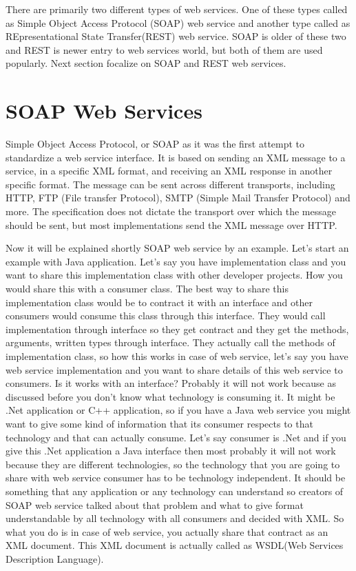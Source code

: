 There are primarily two different types of web services. One of these types called as  Simple Object Access Protocol (SOAP) web service and another type called as REpresentational State Transfer(REST) web service. SOAP is older of these two and REST is newer entry to web services world, but both of them are used popularly. Next section focalize on SOAP and REST web services.

\section{SOAP Web Services}
\label{section:soa}

Simple Object Access Protocol, or SOAP as it was the first attempt to standardize a web service interface. It is based on sending an XML message to a service, in a specific XML format, and receiving an XML response in another specific format. The message can be sent across different transports, including HTTP, FTP (File transfer Protocol), SMTP (Simple Mail Transfer Protocol) and more\citep{thesis:state2}. The specification does not dictate the transport over which the message should be sent, but most implementations send the XML message over HTTP.

Now it will be explained shortly SOAP web service by an example. Let’s start an example with Java application. Let’s say you have implementation class and you want to share this implementation class with other developer projects. How you would share this with a consumer class. The best way to share this implementation class would be to contract it with an interface and other consumers would consume this class through this interface. They would call implementation through interface so they get contract and they get the methods, arguments, written types through interface. They actually call the methods of implementation class, so how this works in case of web service, let’s say you have web service implementation and you want to share details of this web service to consumers. Is it works with an interface? Probably it will not work because as discussed before you don’t know what technology is consuming it. It might be .Net application or C++ application, so if you have a Java web service you might want to give some kind of information that its consumer respects to that technology and that can actually consume. Let’s say consumer is .Net and if you give this .Net application a Java interface then most probably it will not work because they are different technologies, so the technology that you are going to share with web service consumer has to be technology independent. It should be something that any application or any technology can understand so creators of SOAP web service talked about that problem and what to give format understandable by all technology with all consumers and decided with XML. So what you do is in case of web service, you actually share that contract as an XML document. This XML document is actually called as WSDL(Web Services Description Language)\citep{thesis:state3}.

